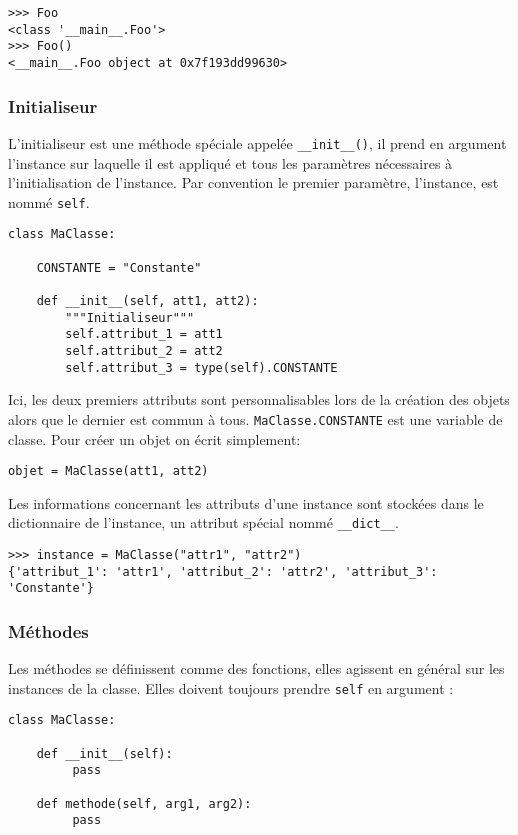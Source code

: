 \begin{verbatim}
>>> Foo
<class '__main__.Foo'>
>>> Foo()
<__main__.Foo object at 0x7f193dd99630>
\end{verbatim}

\subsubsection{Initialiseur}

L'initialiseur est une méthode spéciale appelée \texttt{__init__()}, il prend en argument l'instance sur laquelle il est appliqué et tous les paramètres nécessaires à l'initialisation de l'instance. Par convention le premier paramètre, l'instance, est nommé \texttt{self}.

\begin{verbatim}
class MaClasse:

    CONSTANTE = "Constante"

    def __init__(self, att1, att2):
        """Initialiseur"""
        self.attribut_1 = att1
        self.attribut_2 = att2
        self.attribut_3 = type(self).CONSTANTE
\end{verbatim}

Ici, les deux premiers attributs sont personnalisables lors de la création des objets alors que le dernier est commun à tous. \texttt{MaClasse.CONSTANTE} est une variable de classe. Pour créer un objet on écrit simplement:

\begin{verbatim}
objet = MaClasse(att1, att2)
\end{verbatim}

Les informations concernant les attributs d'une instance sont stockées dans le dictionnaire de l'instance, un attribut spécial nommé \texttt{__dict__}.

\begin{verbatim}
>>> instance = MaClasse("attr1", "attr2")
{'attribut_1': 'attr1', 'attribut_2': 'attr2', 'attribut_3': 'Constante'}
\end{verbatim}

\subsubsection{Méthodes}
Les méthodes se définissent comme des fonctions, elles agissent en général sur les instances de la classe. Elles doivent toujours prendre \texttt{self} en argument :
\begin{verbatim}
class MaClasse:

    def __init__(self):
         pass

    def methode(self, arg1, arg2):
         pass
\end{verbatim}

